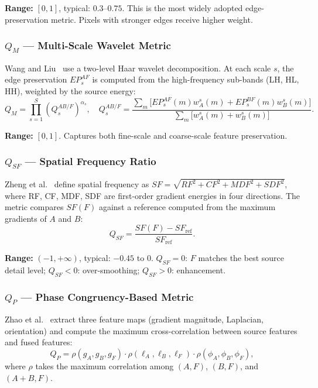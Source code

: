 \documentclass[a4paper,12pt]{article}
\begin{document}
\textbf{Range:} $[0,1]$, typical: $0.3$--$0.75$.
This is the most widely adopted edge-preservation metric. Pixels with stronger
edges receive higher weight.

\subsubsection{$Q_M$ --- Multi-Scale Wavelet Metric}

Wang and Liu~\cite{wang2008} use a two-level Haar wavelet decomposition.
At each scale $s$, the edge preservation $EP_s^{AF}$ is computed from the
high-frequency sub-bands (LH, HL, HH), weighted by the source energy:
\begin{equation}
  Q_M = \prod_{s=1}^{S} \left(Q_s^{AB/F}\right)^{\alpha_s}, \quad
  Q_s^{AB/F} = \frac{\sum_m \bigl[EP_s^{AF}(m) w_A^s(m) + EP_s^{BF}(m) w_B^s(m)\bigr]}
                     {\sum_m \bigl[w_A^s(m) + w_B^s(m)\bigr]}.
\end{equation}

\textbf{Range:} $[0,1]$.
Captures both fine-scale and coarse-scale feature preservation.

\subsubsection{$Q_{SF}$ --- Spatial Frequency Ratio}

Zheng et al.~\cite{zheng2007} define spatial frequency as
$SF = \sqrt{RF^2 + CF^2 + MDF^2 + SDF^2}$, where RF, CF, MDF, SDF are
first-order gradient energies in four directions. The metric compares
$SF(F)$ against a reference computed from the maximum gradients of $A$
and $B$:
\begin{equation}
  Q_{SF} = \frac{SF(F) - SF_{\text{ref}}}{SF_{\text{ref}}}.
\end{equation}

\textbf{Range:} $(-1, +\infty)$, typical: $-0.45$ to $0$.
$Q_{SF} = 0$: $F$ matches the best source detail level;
$Q_{SF} < 0$: over-smoothing; $Q_{SF} > 0$: enhancement.

\subsubsection{$Q_P$ --- Phase Congruency-Based Metric}

Zhao et al.~\cite{zhao2007} extract three feature maps (gradient magnitude,
Laplacian, orientation) and compute the maximum cross-correlation between
source features and fused features:
\begin{equation}
  Q_P = \rho(g_A, g_B, g_F) \cdot \rho(\ell_A, \ell_B, \ell_F) \cdot \rho(\phi_A, \phi_B, \phi_F),
\end{equation}
where $\rho$ takes the maximum correlation among $(A,F)$, $(B,F)$, and $(A+B,F)$.
\end{document}
